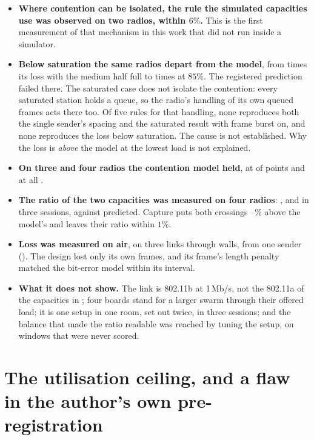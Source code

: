 \begin{itemize}
\item \textbf{Where contention can be isolated, the rule the simulated capacities use was
      observed on two radios, within $6\%$.} This is the first measurement of that mechanism
      in this work that did not run inside a simulator.
\item \textbf{Below saturation the same radios depart from the model}, from \hwPoolLowRatio{}
      times its loss with the medium half full to \hwPoolHighRatio{} times at $85\%$. The
      registered prediction failed there. The saturated case does not isolate the contention:
      every saturated station holds a queue, so the radio's handling of its own queued frames
      acts there too. Of five rules for that handling, none reproduces both the single sender's
      spacing and the saturated result with frame burst on, and none reproduces the loss below
      saturation. The cause is not established. Why the loss is \emph{above} the model at the
      lowest load is not explained.
\item \textbf{On three and four radios the contention model held}, at \hwThreeHeld{} of
      \hwThreePoints{} points and at all \hwFourPoints.
\item \textbf{The ratio of the two capacities was measured on four radios}: \hwRatio,
      \hwRepeatRatio{} and \hwThirdRatio{} in three sessions, against \hwModelRatio{} predicted.
      Capture puts both crossings \hwAboveLo--\hwAboveHi\% above the model's and leaves their ratio
      within $1\%$.
\item \textbf{Loss was measured on air}, on three links through walls, from one sender
      (). The design lost only its own frames, and its frame's length penalty
      matched the bit-error model within its interval.
\item \textbf{What it does not show.} The link is 802.11b at 1\,Mb/s, not the 802.11a of the
      capacities in ; four boards stand for a larger swarm through their
      offered load; it is one setup in one room, set out twice, in three sessions; and the
      balance that made the ratio readable was reached by tuning the setup, on windows that
      were never scored.
\end{itemize}

\section{The utilisation ceiling, and a flaw in the author's own pre-registration}

